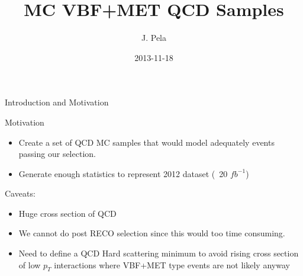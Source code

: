 \documentclass[8pt]{beamer}
\author[João Pela]{J. Pela}
\title[]{MC VBF+MET QCD Samples}
\institute{Imperial College London}
\date{2013-11-18}
\begin{document}
\setlength{\unitlength}{1mm}

\begin{frame}
  \titlepage
\end{frame}

\begin{frame}{Introduction and Motivation}

\begin{block}{Motivation}

  \begin{itemize}
    \item Create a set of QCD MC samples that would model adequately events passing our selection.
    \item Generate enough statistics to represent 2012 dataset (~20 $fb^{-1}$)
  \end{itemize}
  
\end{block}

\begin{block}{Caveats:}

  \begin{itemize}
    \item Huge cross section of QCD
    \item We cannot do post RECO selection since this would too time consuming.
    \item Need to define a QCD Hard scattering minimum to avoid rising cross section of low $p_T$
          interactions where VBF+MET type events are not likely anyway
  \end{itemize}
  
\end{block}

\end{frame}
\end{document}
